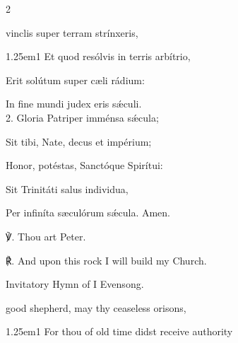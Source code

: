 \begin{paracol}{2}
\sloppy

\firstEvensong\label{PeterAntiochEvensong}

\firstEvensongHymn
{}

 vinclis super terram strínxeris,

\begin{hangparas}{1.25em}{1}
Et quod resólvis in terris arbítrio,

Erit solútum super cæli rádium:

In fine mundi judex eris sǽculi.\\

2. Gloria Patriper imménsa sǽcula;

Sit tibi, Nate, decus et impérium;

Honor, potéstas, Sanctóque Spirítui:

Sit Trinitáti salus individua,

Per infiníta sæculórum sǽcula. Amen.\\
\end{hangparas}

    
    ℣. Thou art Peter.

	℟. And upon this rock I will build my Church.
	

\switchcolumn

\mattins
{}

\begin{rubric}
	Invitatory Hymn of I Evensong.
\end{rubric}

\mattinsOfficeHymn\label{PeterAntiochMattins}

 good shepherd, may thy ceaseless orisons,

\begin{hangparas}{1.25em}{1}
For thou of old time didst receive authority


\end{hangparas}
\end{paracol}
